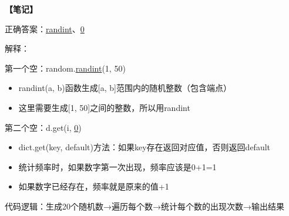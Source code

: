 \begin{mdframed}[linewidth=1pt, linecolor=black]

  \textbf{\color{red}【笔记】}

  正确答案：\underline{randint}、\underline{0}

  解释：

  \qquad 第一个空：random.\underline{randint}(1, 50)
  \begin{itemize}
    \item randint(a, b)函数生成[a, b]范围内的随机整数（包含端点）
    \item 这里需要生成[1, 50]之间的整数，所以用randint
  \end{itemize}

  \qquad 第二个空：d.get(i, \underline{0})
  \begin{itemize}
    \item dict.get(key, default)方法：如果key存在返回对应值，否则返回default
    \item 统计频率时，如果数字第一次出现，频率应该是0+1=1
    \item 如果数字已经存在，频率就是原来的值+1
  \end{itemize}

  \qquad 代码逻辑：生成20个随机数→遍历每个数→统计每个数的出现次数→输出结果

\end{mdframed}